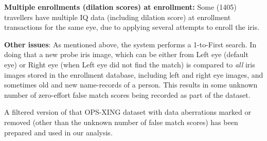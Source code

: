 \documentclass{cta-author}%
\begin{document}
\textbf{Multiple enrollments (dilation scores) at enrollment:} Some 
(1405) 
travellers have multiple IQ data (including dilation score) at enrollment transactions for the same eye, due to applying several attempts to enroll the iris.


\textbf{Other issues}:  
As mentioned above, the system performs a 1-to-First search. In doing that a new probe iris image, which can be either from  Left eye (default eye) or Right eye (when Left eye did not find the match) is compared to \textit{all} iris images stored in the enrollment database, including left and right eye images, and sometimes old and new name-records of a person.  
This results in some unknown number of zero-effort false match scores being recorded as part of the dataset.




A  filtered  version of that OPS-XING  dataset with
data aberrations marked or removed  (other than the unknown number of false match scores) has been prepared and used in our analysis.



\end{document}
